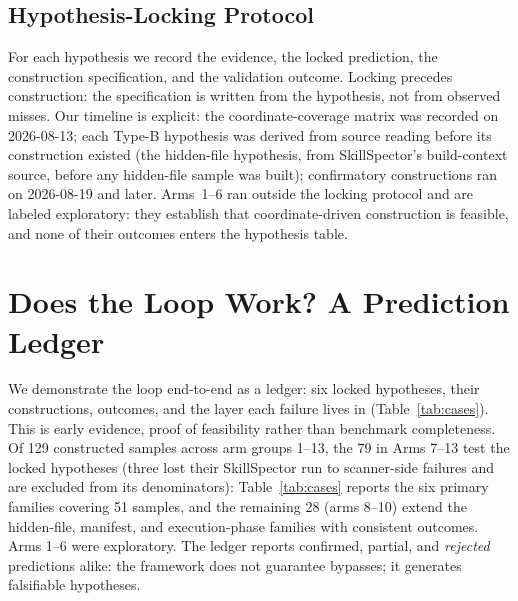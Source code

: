 \documentclass[sigconf,nonacm]{acmart}
\begin{document}
\subsection{Hypothesis-Locking Protocol}
For each hypothesis we record the evidence, the locked prediction, the construction specification, and the validation outcome. Locking precedes construction: the specification is written from the hypothesis, not from observed misses. Our timeline is explicit: the coordinate-coverage matrix was recorded on 2026-08-13; each Type-B hypothesis was derived from source reading before its construction existed (the hidden-file hypothesis, from SkillSpector's build-context source, before any hidden-file sample was built); confirmatory constructions ran on 2026-08-19 and later. Arms~1--6 ran outside the locking protocol and are labeled exploratory: they establish that coordinate-driven construction is feasible, and none of their outcomes enters the hypothesis table.

\section{Does the Loop Work? A Prediction Ledger}
\label{sec:validate}

We demonstrate the loop end-to-end as a ledger: six locked hypotheses, their constructions, outcomes, and the layer each failure lives in (Table~\ref{tab:cases}). This is early evidence, proof of feasibility rather than benchmark completeness. Of 129 constructed samples across arm groups 1--13, the 79 in Arms 7--13 test the locked hypotheses (three lost their SkillSpector run to scanner-side failures and are excluded from its denominators): Table~\ref{tab:cases} reports the six primary families covering 51 samples, and the remaining 28 (arms 8--10) extend the hidden-file, manifest, and execution-phase families with consistent outcomes. Arms 1--6 were exploratory. The ledger reports confirmed, partial, and \emph{rejected} predictions alike: the framework does not guarantee bypasses; it generates falsifiable hypotheses.
\end{document}
